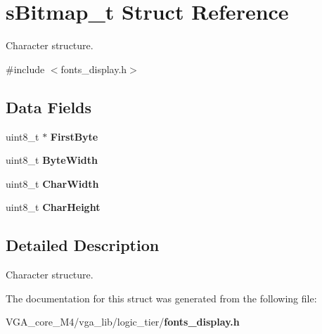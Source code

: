 \section{s\+Bitmap\+\_\+t Struct Reference}
\label{structs_bitmap__t}


Character structure.  




{\ttfamily \#include $<$fonts\+\_\+display.\+h$>$}

\subsection*{Data Fields}
\begin{DoxyCompactItemize}
\item 
uint8\+\_\+t $\ast$ {\bfseries First\+Byte}\label{structs_bitmap__t_ae151f0c2443bc8b484b8a994c0a9964e}

\item 
uint8\+\_\+t {\bfseries Byte\+Width}\label{structs_bitmap__t_a529cf05c3005d9dbff96a15ad4847374}

\item 
uint8\+\_\+t {\bfseries Char\+Width}\label{structs_bitmap__t_acc407273f5f329612c14c928040f1278}

\item 
uint8\+\_\+t {\bfseries Char\+Height}\label{structs_bitmap__t_a717b0d35deae13e7d543e398795dc0ab}

\end{DoxyCompactItemize}


\subsection{Detailed Description}
Character structure. 

The documentation for this struct was generated from the following file\+:\begin{DoxyCompactItemize}
\item 
V\+G\+A\+\_\+core\+\_\+\+M4/vga\+\_\+lib/logic\+\_\+tier/{\bf fonts\+\_\+display.\+h}\end{DoxyCompactItemize}
